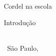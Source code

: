 \begingroup
\centering

\vspace*{30mm}

{\fontsize{14pt}{\baselineskip}\selectfont
\textbf{\autor}\par}

\cleardoublepage

Cordel na escola\par

\vspace*{40mm}

{\fontsize{14pt}{\baselineskip}\selectfont
\textbf{\autor}\par}

\vspace*{20mm}

Introdução\par
\textit{\introdutor}\par

\vspace*{50mm}

\logodois\\
\ São Paulo, \the\year\par

\endgroup
\clearpage

